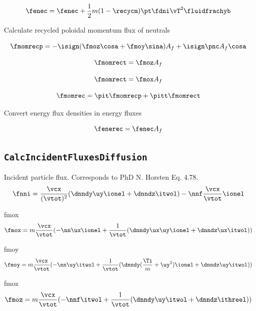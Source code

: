 \begin{equation}
    \fenec = \fenec + \frac{1}{2} m (1-\recycm) \pt \fdni \vT^2 \fluidfrachyb
\end{equation}

Calculate recycled poloidal momentum flux of neutrals

\begin{equation}
\fmomrecp = - \isign (\fmoz \cosa + \fmoy \sina) A_f + \isign \pnc A_f \cosa
\end{equation}

\begin{equation}
    \fmomrect = \fmoz A_f
\end{equation}

\begin{equation}
    \fmomrect = \fmox A_f
\end{equation}

\begin{equation}
    \fmomrec =  \pit \fmomrecp + \pitt \fmomrect
\end{equation}

Convert energy flux densities in energy fluxes

\begin{equation}
    \fenerec = \fenec A_f
\end{equation}


\subsection{\texttt{CalcIncidentFluxesDiffusion}}

Incident particle flux. Corresponds to PhD N. Horsten Eq. 4.78.
\begin{equation}
          \fnni = \frac{\vcx}{(\vtot)^2}(\dnndy \uy \ionel + \dnndz \itwol) -         \nnf \frac{\vcx}{\vtot} \ionel
\end{equation}

fmox
\begin{equation}
          \fmox = m \frac{\vcx}{\vtot} (-\nn \ux \ionel +
          \frac{1}{\vtot} (\dnndy \ux \uy \ionel +
          \dnndz \ux \itwol))
\end{equation}

fmoy
\begin{equation}
          \fmoy = m  \frac{\vcx}{\vtot} (-\nn \uy \itwol +
          \frac{1}{\vtot} (\dnndy (\frac{\Ti}{m} + \uy^2) \ionel +
          \dnndz \uy \itwol))
\end{equation}

fmoz
\begin{equation}
          \fmoz= m \frac{\vcx}{\vtot}(-\nnf \itwol + \frac{1}{\vtot}(\dnndy \uy \itwol +
          \dnndz \ithreel))
\end{equation}


